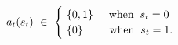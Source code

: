 \begin{equation}
    a_{t}(s_{t}) \ \in \ 
    \begin{cases}
        \ \{ 0, 1 \} \hspace{0.5cm} \text{when} \hspace{0.2cm} s_{t} = 0 \\ 
        \ \{ 0 \} \hspace{0.85cm} \text{when} \hspace{0.2cm} s_{t} = 1.
    \end{cases}
\label{Equation:DCDP-Model_Constraints-of-Control-Variable}
\end{equation}